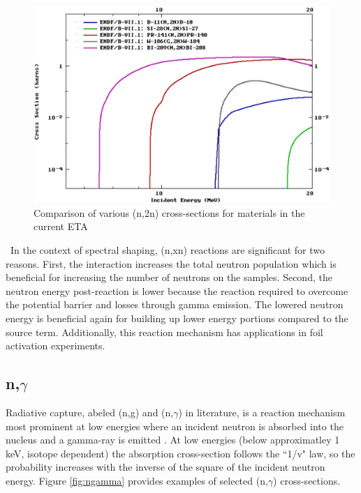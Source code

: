 \begin{figure}[ht]
	\includegraphics[width=\linewidth]{Figures/Chapter2/n2n.png}
	\caption[Comparison of various (n,2n) cross-sections for materials in the current ETA]{Comparison of various (n,2n) cross-sections for materials in the current ETA\cite{ENDF}}
	\label{fig:n2n}
\end{figure}

\ In the context of spectral shaping, (n,xn) reactions are significant for two reasons. 
First, the interaction increases the total neutron population which is beneficial for increasing the number of neutrons on the samples. 
Second, the neutron energy post-reaction is lower because the reaction required to overcome the potential barrier and losses through gamma emission. 
The lowered neutron energy is beneficial again for building up lower energy portions compared to the source term. 
Additionally, this reaction mechanism has applications in foil activation experiments.  

\subsection{n,$\gamma$}

Radiative capture, abeled (n,g) and (n,$\gamma$) in literature, is a reaction mechanism most prominent at low energies where an incident neutron is absorbed into the nucleus and a gamma-ray is emitted \cite{Krane}. 
At low energies (below approximatley 1 keV, isotope dependent) the absorption cross-section follows the ``1/v" law, so the probability increases with the inverse of the square of the incident neutron energy\cite{Turner}. 
Figure \ref{fig:ngamma} provides examples of selected (n,$\gamma$) cross-sections. 

